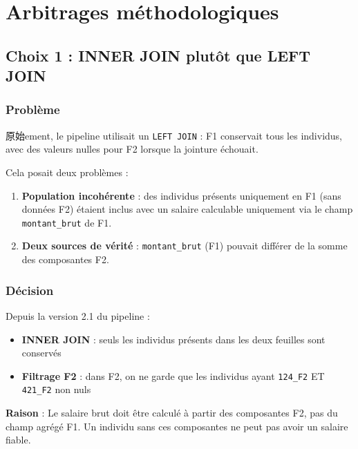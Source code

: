 \documentclass[12pt,a4paper,french]{article}
\newcommand{\code}[1]{\texttt{#1}}
\begin{document}
\section{Arbitrages méthodologiques}

\subsection{Choix 1 : INNER JOIN plutôt que LEFT JOIN}

\subsubsection{Problème}

原始ement, le pipeline utilisait un \texttt{LEFT JOIN} :
F1 conservait tous les individus, avec des valeurs nulles pour F2
lorsque la jointure échouait.

Cela posait deux problèmes :

\begin{enumerate}
    \item \textbf{Population incohérente} : des individus présents uniquement
          en F1 (sans données F2) étaient inclus avec un salaire calculable
          uniquement via le champ \texttt{montant\_brut} de F1.
    \item \textbf{Deux sources de vérité} : \texttt{montant\_brut} (F1)
          pouvait différer de la somme des composantes F2.
\end{enumerate}

\subsubsection{Décision}

Depuis la version 2.1 du pipeline :

\begin{itemize}
    \item \textbf{INNER JOIN} : seuls les individus présents dans les deux
          feuilles sont conservés
    \item \textbf{Filtrage F2} : dans F2, on ne garde que les individus
          ayant \code{124\_F2} ET \code{421\_F2} non nuls
\end{itemize}

\begin{infoboxsimple}
    \textbf{Raison} : Le salaire brut doit être calculé à partir des
    composantes F2, pas du champ agrégé F1. Un individu sans ces composantes
    ne peut pas avoir un salaire fiable.
\end{infoboxsimple}
\end{document}
